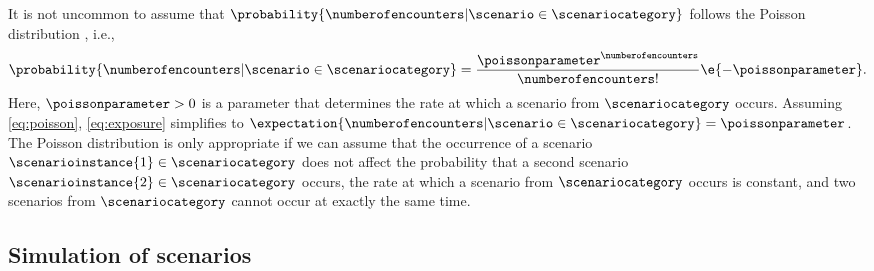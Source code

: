 \begin{remark}
	It is not uncommon to assume that $\probability{\numberofencounters|\scenario\in\scenariocategory}$ follows the Poisson distribution \autocite{nicholson1993accidents, wachenfeld2017new, gyllenhammar2020towards}, i.e., 
	\begin{equation}
		\label{eq:poisson}
		\probability{\numberofencounters|\scenario\in\scenariocategory} = 
		\frac{\poissonparameter^{\numberofencounters}}{\numberofencounters!} \e{-\poissonparameter}.
	\end{equation}
	Here, $\poissonparameter>0$ is a parameter that determines the rate at which a scenario from $\scenariocategory$ occurs.
	Assuming \cref{eq:poisson}, \cref{eq:exposure} simplifies to $\expectation{\numberofencounters|\scenario\in\scenariocategory}=\poissonparameter$.
	The Poisson distribution is only appropriate if we can assume that the occurrence of a scenario $\scenarioinstance{1}\in\scenariocategory$ does not affect the probability that a second scenario $\scenarioinstance{2}\in\scenariocategory$ occurs, the rate at which a scenario from $\scenariocategory$ occurs is constant, and two scenarios from $\scenariocategory$ cannot occur at exactly the same time.
\end{remark}



\subsection{Simulation of scenarios}
\label{sec:simulation}

